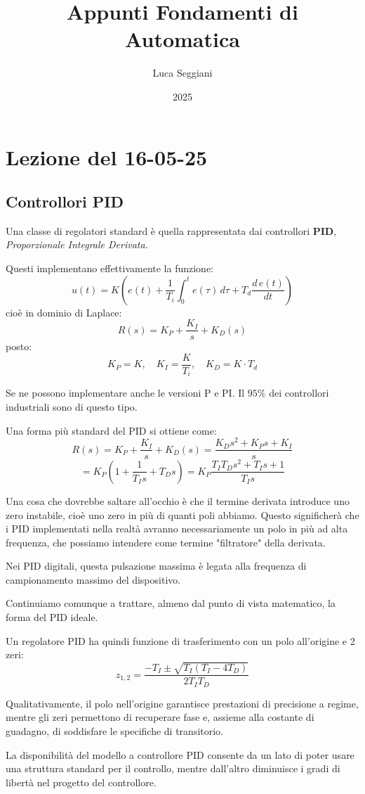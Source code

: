 \documentclass[a4paper,11pt]{article}
\title{Appunti Fondamenti di Automatica}
\author{Luca Seggiani}
\date{2025}
\begin{document}
\section{Lezione del 16-05-25}

\thispagestyle{empty}
\pagestyle{fancy}

\subsection{Controllori PID}
Una classe di regolatori standard è quella rappresentata dai controllori \textbf{PID}, \textit{Proporzionale Integrale Derivata}.

Questi implementano effettivamente la funzione:
$$
u(t) = K\left( e(t) + \frac{1}{T_i} \int_0^t e(\tau) \, d\tau + T_d \frac{d \, e(t)}{dt} \right)
$$
cioè in dominio di Laplace:
$$
R(s) = K_P + \frac{K_I}{s} + K_D(s)
$$
posto:
$$
K_P = K, \quad K_I = \frac{K}{T_i}, \quad K_D = K \cdot T_d
$$

Se ne possono implementare anche le versioni P e PI.
Il $95\%$ dei controllori industriali sono di questo tipo.

Una forma più standard del PID si ottiene come:
$$
R(s) = K_P + \frac{K_I}{s} + K_D(s) = \frac{K_D s^2 + K_P s + K_I}{s}
$$
$$
= K_P\left( 1 + \frac{1}{T_I s} + T_D s \right) = K_P \frac{T_I T_D s^2 + T_I s + 1}{T_I s}
$$

Una cosa che dovrebbe saltare all'occhio è che il termine derivata introduce uno zero instabile, cioè uno zero in più di quanti poli abbiamo.
Questo significherà che i PID implementati nella realtà avranno necessariamente un polo in più ad alta frequenza, che possiamo intendere come termine "filtratore" della derivata.

Nei PID digitali, questa pulsazione massima è legata alla frequenza di campionamento massimo del dispositivo.

Continuiamo comunque a trattare, almeno dal punto di vista matematico, la forma del PID ideale.

Un regolatore PID ha quindi funzione di trasferimento con un polo all'origine e 2 zeri:
$$
z_{1, 2} = \frac{- T_I \pm \sqrt{T_I(T_I - 4 T_D)}}{2 T_I T_D}
$$

Qualitativamente, il polo nell'origine garantisce prestazioni di precisione a regime, mentre gli zeri permettono di recuperare fase e, assieme alla costante di guadagno, di soddisfare le specifiche di transitorio.

La disponibilità del modello a controllore PID consente da un lato di poter usare una struttura standard per il controllo, mentre dall'altro diminuisce i gradi di libertà nel progetto del controllore.
\end{document}
